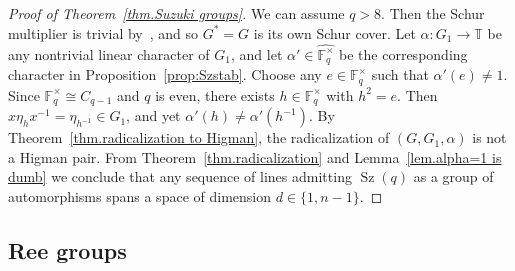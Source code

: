 \begin{proof}[Proof of Theorem~\ref{thm.Suzuki groups}]
We can assume $q > 8$. 
Then the Schur multiplier is trivial by~\cite[Theorem~1]{AlperinGorenstein:66}, and so $G^* = G$ is its own Schur cover.
Let $\alpha \colon G_1 \to \mathbb{T}$ be any nontrivial linear character of $G_1$, and let $\alpha' \in \widehat{ \mathbb{F}_q^\times }$ be the corresponding character in Proposition~\ref{prop:Szstab}.
Choose any $e \in \mathbb{F}_q^\times$ such that $\alpha'(e) \neq 1$.
Since $\mathbb{F}_q^\times \cong C_{q-1}$ and $q$ is even, there exists $h \in \mathbb{F}_q^\times$ with $h^2 = e$.
Then $x \eta_h x^{-1} = \eta_{h^{-1}} \in G_1$, and yet $\alpha'(h) \neq \alpha'(h^{-1})$.
By Theorem~\ref{thm.radicalization to Higman}, the radicalization of $(G,G_1, \alpha)$ is not a Higman pair.
From Theorem~\ref{thm.radicalization} and Lemma~\ref{lem.alpha=1 is dumb} we conclude that any sequence of lines admitting $\operatorname{Sz}(q)$ as a group of automorphisms spans a space of dimension $d \in \{1,n-1\}$.
\end{proof}



\subsection{Ree groups}

